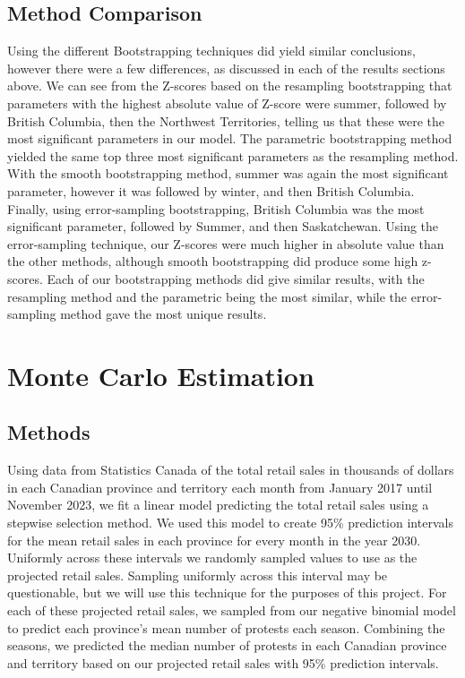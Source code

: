 \documentclass[12pt]{article}
\begin{document}
\subsection{Method Comparison}
Using the different Bootstrapping techniques did yield similar conclusions, however there were a few differences, as discussed in each of the results sections above. We can see from the Z-scores based on the resampling bootstrapping that parameters with the highest absolute value of Z-score were summer, followed by British Columbia, then the Northwest Territories, telling us that these were the most significant parameters in our model. The parametric bootstrapping method yielded the same top three most significant parameters as the resampling method. With the smooth bootstrapping method, summer was again the most significant parameter, however it was followed by winter, and then British Columbia. Finally, using error-sampling bootstrapping, British Columbia was the most significant parameter, followed by Summer, and then Saskatchewan. Using the error-sampling technique, our Z-scores were much higher in absolute value than the other methods, although smooth bootstrapping did produce some high z-scores.
Each of our bootstrapping methods did give similar results, with the resampling method and the parametric being the most similar, while the error-sampling method gave the most unique results.

\newpage
\section{Monte Carlo Estimation}
\subsection*{Methods}
Using data from Statistics Canada of the total retail sales in thousands of dollars in each Canadian province and territory each month from January 2017 until November 2023, we fit a linear model predicting the total retail sales using a stepwise selection method. We used this model to create 95\% prediction intervals for the mean retail sales in each province for every month in the year 2030. Uniformly across these intervals we randomly sampled values to use as the projected retail sales. Sampling uniformly across this interval may be questionable, but we will use this technique for the purposes of this project. For each of these projected retail sales, we sampled from our negative binomial model to predict each province's mean number of protests each season. Combining the seasons, we predicted the median number of protests in each Canadian province and territory based on our projected retail sales with 95\% prediction intervals. 
\end{document}
